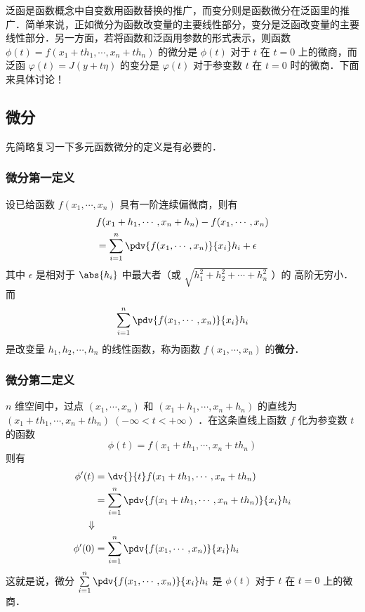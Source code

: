 
泛函是函数概念中自变数用函数替换的推广，而变分则是函数微分在泛函里的推广．简单来说，正如微分为函数改变量的主要线性部分，变分是泛函改变量的主要线性部分．另一方面，若将函数和泛函用参数的形式表示，则函数$\phi(t)=f(x_1+th_1,\cdots,x_n+th_n) $ 的微分是 $\phi(t)$ 对于 $t$ 在 $t=0$ 上的微商，而泛函 $\varphi(t)=J(y+t\eta)$ 的变分是 $\varphi(t)$ 对于参变数 $t$ 在 $t=0$ 时的微商．下面来具体讨论！
\subsection{微分}
先简略复习一下多元函数微分的定义是有必要的．
\subsubsection{微分第一定义}
设已给函数 $f(x_1,\cdots,x_n)$ 具有一阶连续偏微商，则有
\begin{equation}
\begin{aligned}
&f(x_1+h_1,\cdots,x_n+h_n)-f(x_1,\cdots,x_n)\\
&=\sum_{i=1}^{n} \pdv{f(x_1,\cdots,x_n)}{x_i}h_i+\epsilon
\end{aligned}
\end{equation}
其中 $\epsilon$ 是相对于 $\abs{h_i}$ 中最大者（或 $\sqrt{h_1^2+h_2^2+\cdots+h_n^2}$ ）的 高阶无穷小．而 
\begin{equation}
\sum_{i=1}^{n} \pdv{f(x_1,\cdots,x_n)}{x_i}h_i
\end{equation}
是改变量 $h_1,h_2,\cdots,h_n$ 的线性函数，称为函数 $f(x_1,\cdots,x_n)$ 的\textbf{微分}．
\subsubsection{微分第二定义}
$n$ 维空间中，过点 $(x_1,\cdots,x_n)$ 和 $(x_1+h_1,\cdots,x_n+h_n)$ 的直线为 $(x_1+th_1,\cdots,x_n+th_n)\;(-\infty<t<+\infty)$ ．在这条直线上函数 $f$ 化为参变数 $t$ 的函数
\begin{equation}
\phi(t)=f(x_1+th_1,\cdots,x_n+th_n) 
\end{equation}
则有
\begin{equation}
\begin{aligned}
\phi'(t)&=\dv{}{t}f(x_1+th_1,\cdots,x_n+th_n) \\
&=\sum_{i=1}^n\pdv{f(x_1+th_1,\cdots,x_n+th_n)}{x_i}h_i
\\
\Downarrow
\\
\phi'(0)&=\sum_{i=1}^n\pdv{f(x_1,\cdots,x_n)}{x_i}h_i
\end{aligned}
\end{equation}
这就是说，微分 $\sum\limits_{i=1}^n\pdv{f(x_1,\cdots,x_n)}{x_i}h_i$ 是 $\phi(t)$ 对于 $t$ 在 $t=0$ 上的微商．